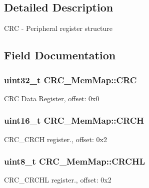 \subsection{Detailed Description}
C\+R\+C -\/ Peripheral register structure 

\subsection{Field Documentation}
\hypertarget{struct_c_r_c___mem_map_acfe268e8629b93af602c35ce7e917bf7}{}
\subsubsection[{C\+R\+C}]{\setlength{\rightskip}{0pt plus 5cm}uint32\+\_\+t C\+R\+C\+\_\+\+Mem\+Map\+::\+C\+R\+C}\label{struct_c_r_c___mem_map_acfe268e8629b93af602c35ce7e917bf7}
C\+R\+C Data Register, offset\+: 0x0 \hypertarget{struct_c_r_c___mem_map_a686eb1f6250f2141314e79ac63d07b05}{}
\subsubsection[{C\+R\+C\+H}]{\setlength{\rightskip}{0pt plus 5cm}uint16\+\_\+t C\+R\+C\+\_\+\+Mem\+Map\+::\+C\+R\+C\+H}\label{struct_c_r_c___mem_map_a686eb1f6250f2141314e79ac63d07b05}
C\+R\+C\+\_\+\+C\+R\+C\+H register., offset\+: 0x2 \hypertarget{struct_c_r_c___mem_map_af8040ed6eefc8200e2cb2564550481ab}{}
\subsubsection[{C\+R\+C\+H\+L}]{\setlength{\rightskip}{0pt plus 5cm}uint8\+\_\+t C\+R\+C\+\_\+\+Mem\+Map\+::\+C\+R\+C\+H\+L}\label{struct_c_r_c___mem_map_af8040ed6eefc8200e2cb2564550481ab}
C\+R\+C\+\_\+\+C\+R\+C\+H\+L register., offset\+: 0x2 \hypertarget{struct_c_r_c___mem_map_a6a8a36dbd6cc59ba899a8e7be34d05df}{}

